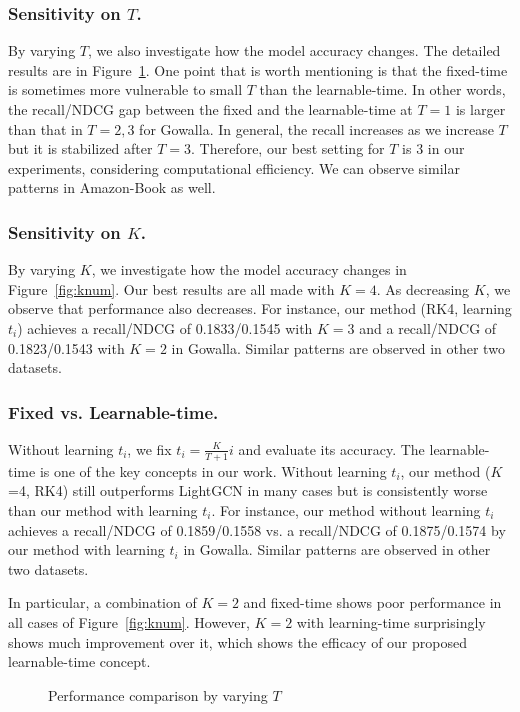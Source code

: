 \documentclass[sigconf]{acmart}
\begin{document}
\subsubsection{Sensitivity on $T$.} By varying $T$, we also investigate how the model accuracy changes. The detailed results are in Figure~\ref{fig:tnum}. One point that is worth mentioning is that the fixed-time is sometimes more vulnerable to small $T$ than the learnable-time. In other words, the recall/NDCG gap between the fixed and the learnable-time at $T=1$ is larger than that in $T=2,3$ for Gowalla. In general, the recall increases as we increase $T$ but it is stabilized after $T=3$. Therefore, our best setting for $T$ is 3 in our experiments, considering computational efficiency. We can observe similar patterns in Amazon-Book as well.

\subsubsection{Sensitivity on $K$.} By varying $K$, we investigate how the model accuracy changes in Figure~\ref{fig:knum}. Our best results are all made with $K=4$. As decreasing $K$, we observe that performance also decreases. For instance, our method (RK4, learning $t_i$) achieves a recall/NDCG of 0.1833/0.1545 with $K=3$ and a recall/NDCG of 0.1823/0.1543 with $K=2$ in Gowalla. Similar patterns are observed in other two datasets.

\subsubsection{Fixed vs. Learnable-time.} Without learning $t_i$, we fix $t_i = \frac{K}{T+1}i$ and evaluate its accuracy. The learnable-time is one of the key concepts in our work. Without learning $t_i$, our method ($K$=4, RK4) still outperforms LightGCN in many cases but is consistently worse than our method with learning $t_i$. For instance, our method without learning $t_i$ achieves a recall/NDCG of 0.1859/0.1558 vs. a recall/NDCG of 0.1875/0.1574 by our method with learning $t_i$ in Gowalla. Similar patterns are observed in other two datasets.

In particular, a combination of $K=2$ and fixed-time shows poor performance in all cases of Figure~\ref{fig:knum}. However, $K=2$ with learning-time surprisingly shows much improvement over it, which shows the efficacy of our proposed learnable-time concept.

\begin{figure}[t]
\centering
{}
\caption{Performance comparison by varying $T$} \label{fig:tnum}
\end{figure}
\end{document}
